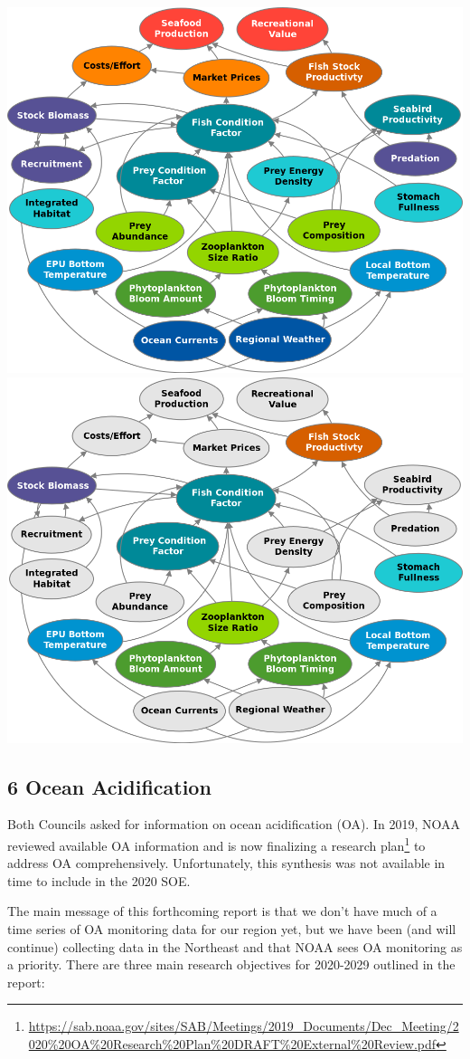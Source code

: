 \documentclass[
  10pt,
]{article}
\let\origfigure\figure
\let\endorigfigure\endfigure
\renewenvironment{figure}[1][2] {
    \expandafter\origfigure\expandafter[H]
} {
    \endorigfigure
}
\begin{document}
\begin{figure}

{\centering \includegraphics[width=0.49\linewidth]{images/SOEconditionfactorlinks_color} \includegraphics[width=0.49\linewidth]{images/SOEconditionfactorlinks_keycolor} 

}

\caption{Full set of hypothesized relationships between SOE indicators related to fish condition (left) and subset to be investigated first (right).}\label{fig:researchlinks}
\end{figure}

\hypertarget{ocean-acidification}{%
\subsection{6 Ocean Acidification}\label{ocean-acidification}}

Both Councils asked for information on ocean acidification (OA). In
2019, NOAA reviewed available OA information and is now finalizing a
research plan\footnote{\url{https://sab.noaa.gov/sites/SAB/Meetings/2019_Documents/Dec_Meeting/2020\%20OA\%20Research\%20Plan\%20DRAFT\%20External\%20Review.pdf}}
to address OA comprehensively. Unfortunately, this synthesis was not
available in time to include in the 2020 SOE.

The main message of this forthcoming report is that we don't have much
of a time series of OA monitoring data for our region yet, but we have
been (and will continue) collecting data in the Northeast and that NOAA
sees OA monitoring as a priority. There are three main research
objectives for 2020-2029 outlined in the report:
\end{document}
